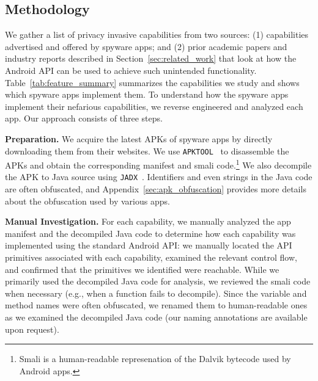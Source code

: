 \documentclass[sigconf,balance=false]{acmart}
\newcommand{\geoff}[1]{\textcolor{purple}{\noindent[GV: #1]}}
\newcommand{\geoff}[1]{}
\begin{document}
\subsection{Methodology}
\label{subsec:misuse_discovery}



We gather a list of privacy invasive capabilities from two sources: (1)
capabilities advertised and offered by spyware apps; and (2) prior
academic papers and industry reports described in Section~\ref{sec:related_work} that look at how the Android API
can be used to achieve such unintended functionality.
Table~\ref{tab:feature_summary} summarizes the capabilities we study
and shows which spyware apps implement them.
To understand how the spyware apps implement their nefarious capabilities, we reverse engineered and analyzed each app. Our approach consists of three steps.

\textbf{Preparation.} We acquire the latest APKs of spyware apps by directly downloading them from their websites. We use \texttt{APKTOOL}~\cite{ApktoolA72:online} to disassemble the APKs and obtain the corresponding manifest and smali code.\footnote{Smali is a human-readable represenation of the Dalvik bytecode used by Android apps.} We also decompile the APK to Java source using \texttt{JADX}~\cite{skylotja9:online}. Identifiers and even strings in the Java code are often obfuscated, and Appendix~\ref{sec:apk_obfuscation} provides more details about the obfuscation used
by various apps.

\textbf{Manual Investigation.}
For each capability, we manually analyzed the app manifest and the decompiled Java code to determine how
each capability was implemented using the standard Android API: we manually located the API primitives associated with each capability, examined the relevant control flow, and confirmed that the primitives we identified were reachable. While we primarily used the decompiled Java code for
analysis, we reviewed the smali code when necessary (e.g., when a function fails
to decompile). Since the variable and method names were often obfuscated, we renamed them to human-readable ones as we examined the decompiled Java code (our naming annotations are available upon request).
\end{document}
